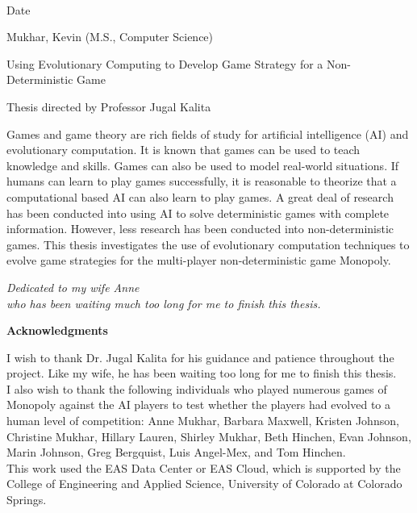 \begin{flushright}
	\vspace{2.0pc}
	\makebox[2in]{\hrulefill} \\[-1.0pc]
	Date
\end{flushright}


\newpage

\setlength{\parindent}{0in}
Mukhar, Kevin (M.S., Computer Science) 

Using Evolutionary Computing to
Develop Game Strategy for a Non-Deterministic Game 

Thesis directed by Professor Jugal Kalita

\vspace{28pt}
\setlength{\parindent}{.4in}

Games and game theory are rich fields of study for artificial intelligence (AI)
and evolutionary computation. It is known that games can be used to teach
knowledge and skills. Games can also be used to model real-world situations. If
humans can learn to play games successfully, it is reasonable to theorize that a
computational based AI can also learn to play games. A great deal of research
has been conducted into using AI to solve deterministic games with complete
information. However, less research has been conducted into non-deterministic
games. This thesis investigates the use of evolutionary computation techniques
to evolve game strategies for the multi-player non-deterministic game Monopoly.

\newpage

\parbox{5.0in}{
	\vspace{2.0in}
	\begin{center}
		{\large{\emph{Dedicated to my wife Anne\\ who has been waiting much
		too long for me to finish this thesis.}}}
	\end{center}
}


\newpage
\begin{center}
	{\large{\bf Acknowledgments}}
\end{center}
\setlength{\parindent}{.4in}

I wish to thank Dr. Jugal Kalita for his guidance and patience throughout the
project. Like my wife, he has been waiting too long for me to finish this
thesis. \\

I also wish to thank the following individuals who played numerous games
of Monopoly against the AI players to test whether the players had evolved to a
human level of competition: Anne Mukhar, Barbara Maxwell, Kristen Johnson,
Christine Mukhar, Hillary Lauren, Shirley Mukhar, Beth Hinchen, Evan Johnson,
Marin Johnson, Greg Bergquist, Luis Angel-Mex, and Tom Hinchen.\\

This work used the EAS Data Center or EAS Cloud, which is supported by the
College of Engineering and Applied Science, University of Colorado at Colorado
Springs.
